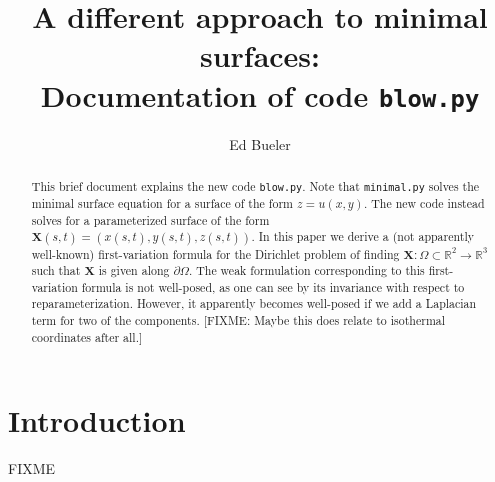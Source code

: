 \documentclass[12pt]{amsart}
\title{A different approach to minimal surfaces: \\ Documentation of code \texttt{blow.py}}
\author{Ed Bueler}
\newcommand\bX{\mathbf{X}}
\newcommand\RR{\mathbb{R}}
\begin{document}
\begin{abstract}
This brief document explains the new code \texttt{blow.py}.  Note that \texttt{minimal.py} solves the minimal surface equation for a surface of the form $z=u(x,y)$.  The new code instead solves for a parameterized surface of the form $\bX(s,t) = (x(s,t),y(s,t),z(s,t))$.  In this paper we derive a (not apparently well-known) first-variation formula for the Dirichlet problem of finding $\bX: \Omega \subset \RR^2 \to \RR^3$ such that $\bX$ is given along $\partial \Omega$.  The weak formulation corresponding to this first-variation formula is not well-posed, as one can see by its invariance with respect to reparameterization.  However, it apparently becomes well-posed if we add a Laplacian term for two of the components.  [FIXME: Maybe this does relate to isothermal coordinates after all.]
\end{abstract}

\maketitle

\thispagestyle{empty}


\section{Introduction}

FIXME

%
%
\end{document}

